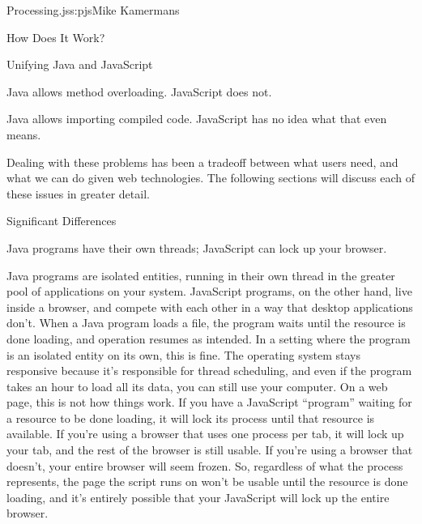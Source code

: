 \begin{aosachapter}{Processing.js}{s:pjs}{Mike Kamermans}
\begin{aosasect1}{How Does It Work?}
\begin{aosasect2}{Unifying Java and JavaScript}
\begin{aosaenumerate}
\item Java allows method overloading. JavaScript does not.

\item Java allows importing compiled code. JavaScript has no idea what
  that even means.

\end{aosaenumerate}

Dealing with these problems has been a tradeoff between what users
need, and what we can do given web technologies. The following
sections will discuss each of these issues in greater detail.

\end{aosasect2}

\end{aosasect1}

\begin{aosasect1}{Significant Differences}

\begin{aosasect3}{Java programs have their own threads; JavaScript can lock up your browser.}

Java programs are isolated entities, running in their own thread in
the greater pool of applications on your system. JavaScript programs,
on the other hand, live inside a browser, and compete with each other
in a way that desktop applications don't. When a Java program loads a
file, the program waits until the resource is done loading, and
operation resumes as intended. In a setting where the program is an
isolated entity on its own, this is fine. The operating system stays
responsive because it's responsible for thread scheduling, and even if
the program takes an hour to load all its data, you can still use your
computer. On a web page, this is not how things work. If you have a
JavaScript ``program'' waiting for a resource to be done loading, it
will lock its process until that resource is available. If you're
using a browser that uses one process per tab, it will lock up your tab,
and the rest of the browser is still usable. If you're using a browser
that doesn't, your entire browser will seem frozen. So, regardless of
what the process represents, the page the script runs on won't be
usable until the resource is done loading, and it's entirely possible
that your JavaScript will lock up the entire browser.


\end{aosasect3}
\end{aosasect1}
\end{aosachapter}

